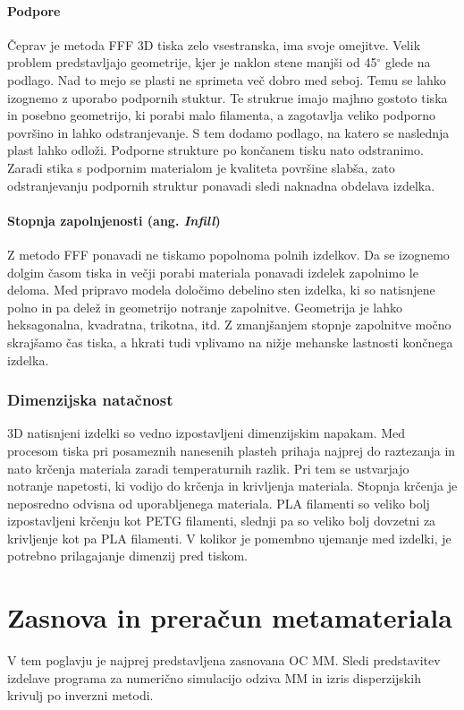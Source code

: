 \documentclass[12pt]{report}
\begin{document}
\subsubsection{Podpore}
Čeprav je metoda \ac{FFF} 3D tiska zelo vsestranska, ima svoje omejitve. Velik problem predstavljajo geometrije, kjer je naklon stene manjši od 45$^{\circ}$ glede na podlago. Nad to mejo se plasti ne sprimeta več dobro med seboj. Temu se lahko izognemo z uporabo podpornih stuktur. Te strukrue imajo majhno gostoto tiska in posebno geometrijo, ki porabi malo filamenta, a zagotavlja veliko podporno površino in lahko odstranjevanje. 
S tem dodamo podlago, na katero se naslednja plast lahko odloži. Podporne strukture po končanem tisku nato odstranimo. Zaradi stika s podpornim materialom je kvaliteta površine slabša, zato
odstranjevanju podpornih struktur ponavadi sledi naknadna obdelava izdelka.\cite{redwood20173d}

\subsubsection{Stopnja zapolnjenosti (ang. \emph{Infill})}
Z metodo \ac{FFF} ponavadi ne tiskamo popolnoma polnih izdelkov. Da se izognemo dolgim časom tiska in večji porabi materiala ponavadi izdelek zapolnimo le deloma. \cite{redwood20173d}
Med pripravo modela določimo debelino sten izdelka, ki so natisnjene polno in pa delež in geometrijo notranje zapolnitve. Geometrija je lahko heksagonalna, kvadratna, trikotna, itd. Z zmanjšanjem stopnje
zapolnitve močno skrajšamo čas tiska, a hkrati tudi vplivamo na nižje mehanske lastnosti končnega izdelka.

\subsection{Dimenzijska natačnost}
3D natisnjeni izdelki so vedno izpostavljeni dimenzijskim napakam. Med procesom tiska pri posameznih nanesenih plasteh prihaja najprej do raztezanja in nato krčenja materiala zaradi temperaturnih
razlik. Pri tem se ustvarjajo notranje napetosti, ki vodijo do krčenja in krivljenja materiala. \cite{redwood20173d} Stopnja krčenja je neposredno odvisna od uporabljenega materiala. PLA filamenti so veliko bolj izpostavljeni krčenju kot PETG filamenti, slednji pa 
so veliko bolj dovzetni za krivljenje kot pa PLA filamenti. V kolikor je pomembno ujemanje med izdelki, je potrebno prilagajanje dimenzij pred tiskom. 

\chapter{Zasnova in preračun metamateriala}
V tem poglavju je najprej predstavljena zasnovana \ac{OC} \ac{MM}. Sledi predstavitev izdelave programa za numerično simulacijo odziva \ac{MM} in izris disperzijskih krivulj po inverzni
metodi.
\end{document}
